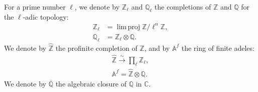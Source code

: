 \documentclass{article}
\theoremstyle{definition}
\newenvironment{env}[1]
    {\renewcommand\theinnerenv{(#1)}\innerenv}
    {\endinnerenv}
\newcommand{\bb}{\mathbb}
\newcommand{\ZZ}{\bb{Z}}
\newcommand{\hZZ}{\widehat{\bb{Z}}}
\renewcommand{\AA}{\bb{A}}
\newcommand{\CC}{\bb{C}}
\newcommand{\QQ}{\bb{Q}}
\newcommand{\cQQ}{\overline{\QQ}}
\DeclareMathOperator{\limproj}{lim\,proj}
\begin{document}
\begin{env}{0.2}
\label{0.2}
  For a prime number $\ell$, we denote by $\ZZ_\ell$ and $\QQ_\ell$ the completions of $\ZZ$ and $\QQ$ for the $\ell$-adic topology:
  \[
    \begin{aligned}
      \ZZ_\ell &= \limproj \ZZ/\ell^n\ZZ,
    \\\QQ_\ell &= \ZZ_\ell\otimes\QQ.
    \end{aligned}
  \]
  We denote by $\hZZ$ the profinite completion of $\ZZ$, and by $\AA^f$ the ring of finite adeles:
  \[
    \begin{gathered}
      \hZZ \xrightarrow{\sim} \prod_\ell \ZZ_\ell,
    \\\AA^f = \hZZ\otimes\QQ.
    \end{gathered}
  \]
  We denote by $\cQQ$ the algebraic closure of $\QQ$ in $\CC$.
\end{env}



\nocite{*}
\end{document}
